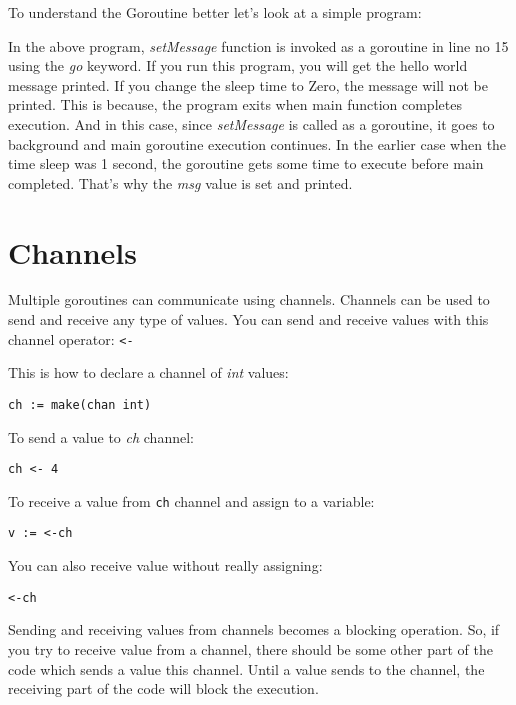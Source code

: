 To understand the Goroutine better let's look at a simple program:



In the above program, \textit{setMessage} function is invoked as a
goroutine in line no 15 using the \textit{go} keyword.  If you run
this program, you will get the hello world message printed.  If you
change the sleep time to Zero, the message will not be printed. This
is because, the program exits when main function completes execution.
And in this case, since \textit{setMessage} is called as a goroutine,
it goes to background and main goroutine execution continues.  In the
earlier case when the time sleep was 1 second, the goroutine gets some
time to execute before main completed.  That's why the \textit{msg}
value is set and printed.

\section{Channels}

Multiple goroutines can communicate using channels.
Channels can be used to send and receive any type of values.  You can
send and receive values with this channel operator: \texttt{<-}

This is how to declare a channel of \textit{int} values:

\begin{lstlisting}[numbers=none]
ch := make(chan int)
\end{lstlisting}

To send a value to \textit{ch} channel:

\begin{lstlisting}[numbers=none]
ch <- 4
\end{lstlisting}

To receive a value from \texttt{ch} channel and assign to a variable:

\begin{lstlisting}[numbers=none]
v := <-ch
\end{lstlisting}

You can also receive value without really assigning:

\begin{lstlisting}[numbers=none]
<-ch
\end{lstlisting}

Sending and receiving values from channels becomes a blocking
operation.  So, if you try to receive value from a channel, there
should be some other part of the code which sends a value this
channel.  Until a value sends to the channel, the receiving part of
the code will block the execution.

